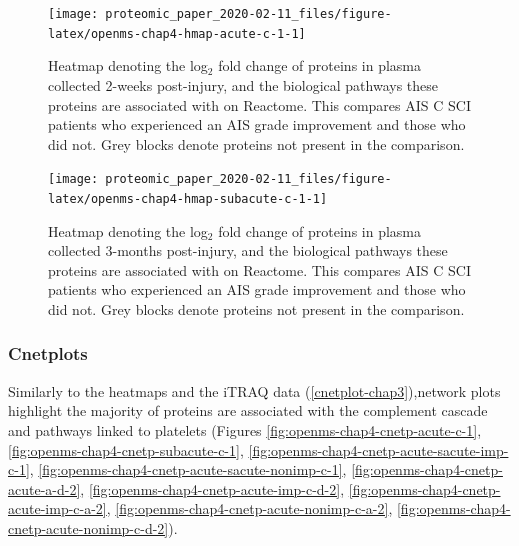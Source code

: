 \documentclass[9pt,lineno]{elife}
\begin{document}
\begin{landscape}



\begin{figure}

{\centering \texttt{[image: proteomic\_paper\_2020-02-11\_files/figure-latex/openms-chap4-hmap-acute-c-1-1]} 

}

\caption{Heatmap denoting the log\(_2\) fold change of proteins in plasma collected 2-weeks post-injury, and the biological pathways these proteins are associated with on Reactome. This compares AIS C SCI patients who experienced an AIS grade improvement and those who did not. Grey blocks denote proteins not present in the comparison.}\label{fig:openms-chap4-hmap-acute-c-1}
\end{figure}

\end{landscape}
\begin{landscape}



\begin{figure}

{\centering \texttt{[image: proteomic\_paper\_2020-02-11\_files/figure-latex/openms-chap4-hmap-subacute-c-1-1]} 

}

\caption{Heatmap denoting the log\(_2\) fold change of proteins in plasma collected 3-months post-injury, and the biological pathways these proteins are associated with on Reactome. This compares AIS C SCI patients who experienced an AIS grade improvement and those who did not. Grey blocks denote proteins not present in the comparison.}\label{fig:openms-chap4-hmap-subacute-c-1}
\end{figure}

\end{landscape}
\clearpage

\hypertarget{cnetplots}{%
\subsubsection{Cnetplots}\label{cnetplots}}

Similarly to the heatmaps and the iTRAQ data (\ref{cnetplot-chap3}),network plots highlight the majority of proteins are associated with the complement cascade and pathways linked to platelets (Figures \ref{fig:openms-chap4-cnetp-acute-c-1}, \ref{fig:openms-chap4-cnetp-subacute-c-1}, \ref{fig:openms-chap4-cnetp-acute-sacute-imp-c-1}, \ref{fig:openms-chap4-cnetp-acute-sacute-nonimp-c-1}, \ref{fig:openms-chap4-cnetp-acute-a-d-2}, \ref{fig:openms-chap4-cnetp-acute-imp-c-d-2}, \ref{fig:openms-chap4-cnetp-acute-imp-c-a-2}, \ref{fig:openms-chap4-cnetp-acute-nonimp-c-a-2}, \ref{fig:openms-chap4-cnetp-acute-nonimp-c-d-2}).
\end{document}
